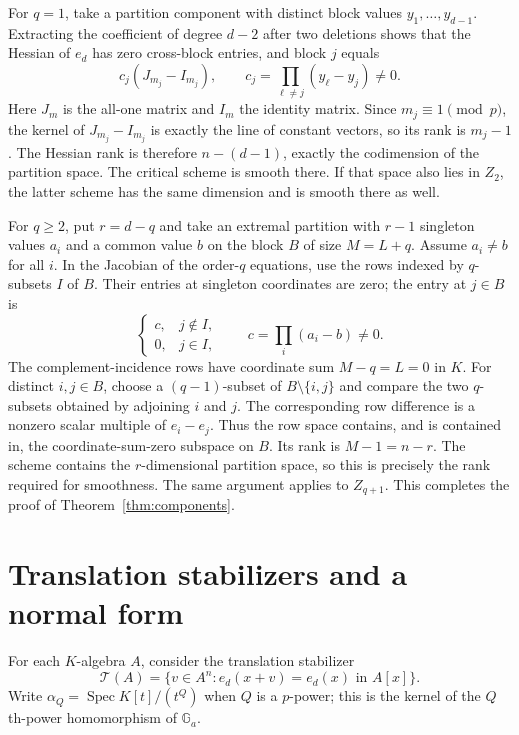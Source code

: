 \documentclass[11pt]{article}
\theoremstyle{remark}
\newcommand{\Ga}{\mathbb G_a}
\newcommand{\Spec}{\operatorname{Spec}}
\begin{document}
For $q=1$, take a partition component with distinct block values
$y_1,\ldots,y_{d-1}$. Extracting the coefficient of degree $d-2$
after two deletions shows that the Hessian of $e_d$ has zero
cross-block entries, and block $j$ equals
\[
 c_j(J_{m_j}-I_{m_j}),\qquad
 c_j=\prod_{\ell\ne j}(y_\ell-y_j)\ne0.
\]
Here $J_m$ is the all-one matrix and $I_m$ the identity matrix.
Since $m_j\equiv1\pmod p$, the kernel of $J_{m_j}-I_{m_j}$ is
exactly the line of constant vectors, so its rank is $m_j-1$. The Hessian
rank is therefore $n-(d-1)$, exactly the codimension of the
partition space. The critical scheme is smooth there. If that
space also lies in $Z_2$, the latter scheme has the same dimension
and is smooth there as well.

For $q\ge2$, put $r=d-q$ and take an extremal partition with
$r-1$ singleton values $a_i$ and a common value $b$ on the block
$B$ of size $M=L+q$. Assume $a_i\ne b$ for all $i$. In the
Jacobian of the order-$q$ equations, use the rows indexed by
$q$-subsets $I$ of $B$. Their entries at singleton coordinates
are zero; the entry at $j\in B$ is
\[
 \begin{cases}c,&j\notin I,\\0,&j\in I,\end{cases}
 \qquad c=\prod_i(a_i-b)\ne0.
\]
The complement-incidence rows have coordinate sum $M-q=L=0$
in $K$. For distinct $i,j\in B$, choose a $(q-1)$-subset of
$B\setminus\{i,j\}$ and compare the two $q$-subsets obtained by
adjoining $i$ and $j$. The corresponding row difference is a
nonzero scalar multiple of $e_i-e_j$. Thus the row space contains,
and is contained in, the coordinate-sum-zero subspace on $B$.
Its rank is $M-1=n-r$. The scheme contains the
$r$-dimensional partition space, so this is precisely the rank
required for smoothness. The same argument applies to $Z_{q+1}$.
This completes the proof of Theorem~\ref{thm:components}.

\section{Translation stabilizers and a normal form}\label{sec:translation}

For each $K$-algebra $A$, consider the translation stabilizer
\[
 \mathcal T(A)=\{v\in A^n:e_d(x+v)=e_d(x)\text{ in }A[x]\}.
\]
Write $\alpha_Q=\Spec K[t]/(t^Q)$ when $Q$ is a $p$-power;
this is the kernel of the $Q$th-power homomorphism of $\Ga$.
\end{document}
